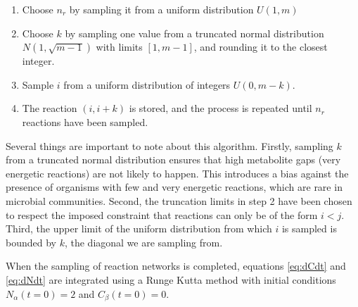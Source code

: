 \documentclass[titlepage,11pt]{article}
\begin{document}
\begin{linenumbers}
				\begin{enumerate}
					\item Choose $ n_{r} $ by sampling it from a uniform distribution $ U \left(1, {m}\right) $
					\item \sloppy Choose $ k $  by sampling one value from a truncated normal distribution $N\left(1,  \sqrt {m - 1}\right)$ with limits $ [1, m-1] $, and rounding it to the closest integer.
					\item Sample $ i $ from a uniform distribution of integers $ U(0, m-k) $.
					\item The reaction $ (i, i + k) $ is stored, and the process is repeated until $ n_{r} $ reactions have been sampled.
				\end{enumerate}
				\hspace{15pt}Several things are important to note about this algorithm. Firstly, sampling $ k $ from a truncated normal distribution ensures that high metabolite gaps (very energetic reactions) are not likely to happen. This introduces a bias against the presence of organisms with few and very energetic reactions, which are rare in microbial communities. Second, the truncation limits in step 2 have been chosen to respect the imposed constraint that reactions can only be of the form $ i < j $. Third, the upper limit of the uniform distribution from which $ i $ is sampled is bounded by $ k $, the diagonal we are sampling from. \par
				When the sampling of reaction networks is completed, equations \ref{eq:dCdt} and \ref{eq:dNdt} are integrated using a Runge Kutta method \citep{Dormand1980} with initial conditions $ N_{\alpha}(t = 0) = 2 $ and $ C_{\beta}(t = 0) = 0 $.

\end{linenumbers}
\end{document}
